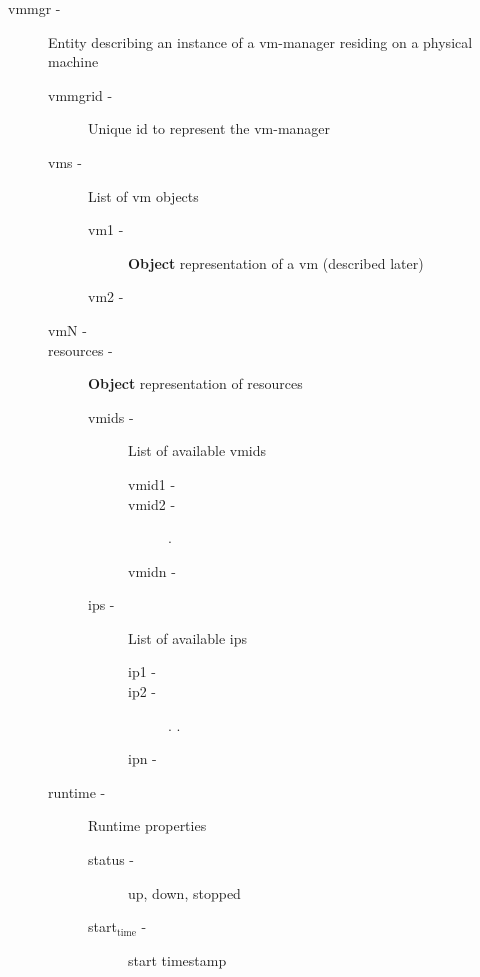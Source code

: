 \documentclass[11pt]{article}
\begin{document}
\begin{description}
\item [vmmgr -] Entity describing an instance of a vm-manager
                   residing on a physical machine

\begin{description}
\item [vmmgrid -] Unique id to represent the vm-manager
\item [vms -] List of vm objects

\begin{description}
\item [vm1 -] \textbf{Object} representation of a vm (described later)
\item [vm2 -]
\end{description}

\item [vmN -]
\item [resources -] \textbf{Object} representation of resources

\begin{description}
\item [vmids -] List of available vmids

\begin{description}
\item [vmid1 -]
\item [vmid2 -]
                       .
\item [vmidn -]
\end{description}

\item [ips -] List of available ips

\begin{description}
\item [ip1 -]
\item [ip2 -]
                       .
                       .
\item [ipn -]
\end{description}

\end{description}

\item [runtime -] Runtime properties

\begin{description}
\item [status -] up, down, stopped
\item [start$_{\mathrm{time}}$ -] start timestamp
\end{description}

\end{description}

\end{description}
\end{document}
